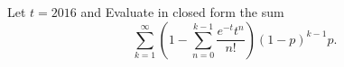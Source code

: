 Let $t = 2016$ and  Evaluate in closed form the sum
\[ \sum_{k=1}^{\infty} 
\left(
	1-\sum_{n=0}^{k-1}\frac{e^{-t}t^{n}}{n!}
\right)
\left(1-p\right)^{k-1}p. \]